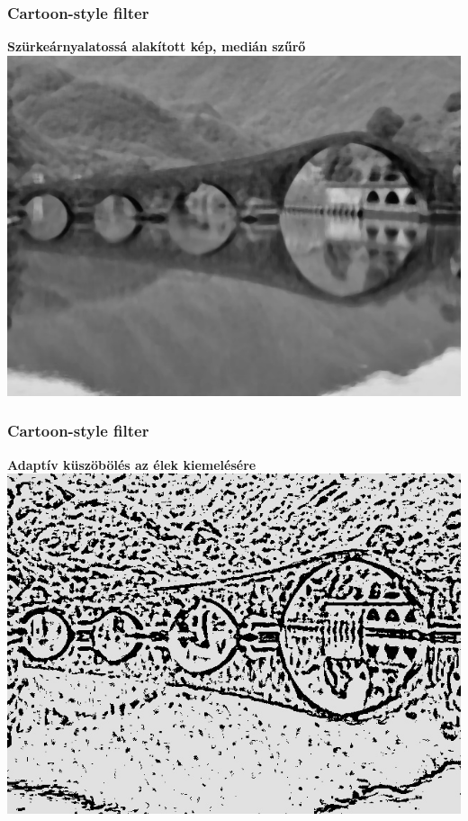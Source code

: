 \documentclass{beamer}
\begin{document}
\begin{frame}[fragile]
\frametitle{Cartoon-style filter}
\begin{center}
\textbf{Szürkeárnyalatossá alakított kép, medián szűrő}
\includegraphics[scale=0.42]{kepek/cartoon_style/graymedian.jpg}
\end{center}
\end{frame}

\begin{frame}[fragile]
\frametitle{Cartoon-style filter}
\begin{center}
\textbf{Adaptív küszöbölés az élek kiemelésére}
\includegraphics[scale=0.42]{kepek/cartoon_style/threshold.jpg}
\end{center}
\end{frame}
\end{document}
